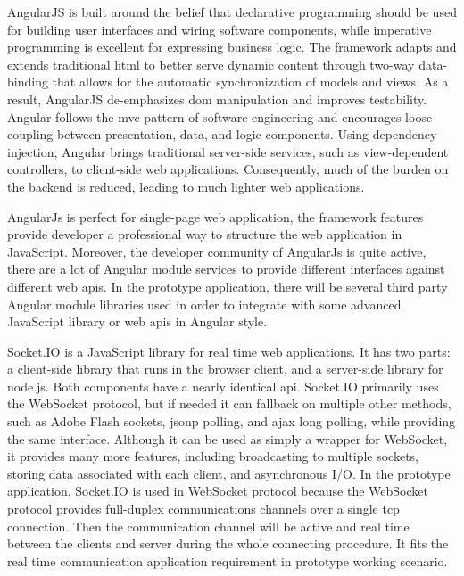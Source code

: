 \par AngularJS is built around the belief that declarative programming should be used for building user interfaces and wiring software components, while imperative programming is excellent for expressing business logic. The framework adapts and extends traditional \gls{html} to better serve dynamic content through two-way data-binding that allows for the automatic synchronization of models and views. As a result, AngularJS de-emphasizes \gls{dom} manipulation and improves testability. Angular follows the \gls{mvc} pattern of software engineering and encourages loose coupling between presentation, data, and logic components. Using dependency injection, Angular brings traditional server-side services, such as view-dependent controllers, to client-side web applications. Consequently, much of the burden on the backend is reduced, leading to much lighter web applications.\cite{wiki:angularjs}

\par AngularJs is perfect for single-page web application, the framework features provide developer a professional way to structure the web application in JavaScript. Moreover, the developer community of AngularJs is quite active, there are a lot of Angular module services to provide different interfaces against different web \gls{api}s. In the prototype application, there will be several third party Angular module libraries used in order to integrate with some advanced JavaScript library or web \gls{api}s in Angular style.

\par Socket.IO is a JavaScript library for real time web applications. It has two parts: a client-side library that runs in the browser client, and a server-side library for node.js. Both components have a nearly identical \gls{api}. Socket.IO primarily uses the WebSocket protocol, but if needed it can fallback on multiple other methods, such as Adobe Flash sockets, \gls{jsonp} polling, and \gls{ajax} long polling, while providing the same interface. Although it can be used as simply a wrapper for WebSocket, it provides many more features, including broadcasting to multiple sockets, storing data associated with each client, and asynchronous I/O.\cite{wiki:socketio} In the prototype application, Socket.IO is used in WebSocket protocol because the WebSocket protocol provides full-duplex communications channels over a single \gls{tcp} connection. Then the communication channel will be active and real time between the clients and server during the whole connecting procedure. It fits the real time communication application requirement in prototype working scenario.

